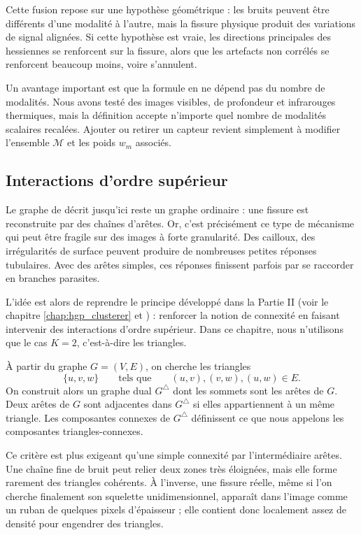 Cette fusion repose sur une hypothèse géométrique : les bruits peuvent être différents d'une modalité à l'autre, mais la fissure physique produit des variations de signal alignées. Si cette hypothèse est vraie, les directions principales des hessiennes se renforcent sur la fissure, alors que les artefacts non corrélés se renforcent beaucoup moins, voire s'annulent. 

Un avantage important est que la formule en  ne dépend pas du nombre de modalités. Nous avons testé des images visibles, de profondeur et infrarouges thermiques, mais la définition accepte n'importe quel nombre de modalités scalaires recalées. Ajouter ou retirer un capteur revient simplement à modifier l'ensemble $\mathcal M$ et les poids $w_m$ associés.

\subsection{Interactions d'ordre supérieur}
\label{subsec:chapIII_interactions_ordre_superieur}

Le graphe de \Frangi{} décrit jusqu'ici reste un graphe ordinaire : une fissure est reconstruite par des chaînes d'arêtes. Or, c'est précisément ce type de mécanisme qui peut être fragile sur des images à forte granularité. Des cailloux, des irrégularités de surface peuvent produire de nombreuses petites réponses tubulaires. Avec des arêtes simples, ces réponses finissent parfois par se raccorder en branches parasites.

L'idée est alors de reprendre le principe développé dans la Partie II (voir le chapitre \ref{chap:hgp_clusterer} et \cite{BibiAppliedNetworkScience}) : renforcer la notion de connexité en faisant intervenir des interactions d'ordre supérieur. Dans ce chapitre, nous n'utilisons que le cas $K=2$, c'est-à-dire les triangles. %

À partir du graphe $G=(V,E)$, on cherche les triangles
\[
    \{u,v,w\}
    \qquad\text{tels que}\qquad
    (u,v),(v,w),(u,w)\in E.
\]
On construit alors un graphe dual $G^\triangle$ dont les sommets sont les arêtes de $G$. Deux arêtes de $G$ sont adjacentes dans $G^\triangle$ si elles appartiennent à un même triangle. Les composantes connexes de $G^\triangle$ définissent ce que nous appelons les composantes triangles-connexes.

Ce critère est plus exigeant qu'une simple connexité par l'intermédiaire arêtes. Une chaîne fine de bruit peut relier deux zones très éloignées, mais elle forme rarement des triangles cohérents. À l'inverse, une fissure réelle, même si l'on cherche finalement son squelette unidimensionnel, apparaît dans l'image comme un ruban de quelques pixels d'épaisseur ; elle contient donc localement assez de densité pour engendrer des triangles. 

